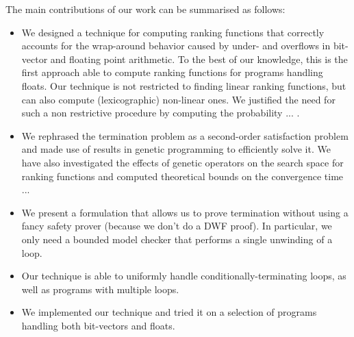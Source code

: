 \documentclass[preprint]{sigplanconf}
\theoremstyle{definition}
\begin{document}


 The main contributions of our work can be summarised as follows:
\begin{itemize}
\item We designed a technique for computing ranking functions that correctly accounts for the wrap-around behavior caused by under- and overflows in bit-vector and floating point arithmetic. To the best of our knowledge, this is the first approach able to compute ranking functions for programs handling floats. Our technique is not restricted to finding linear ranking functions, but can also compute (lexicographic) non-linear  ones. We justified the need for such a non restrictive procedure by computing the probability ... .
\item  We rephrased the termination problem as a second-order satisfaction problem and made 
use of results in genetic programming to efficiently solve it. We have also investigated the effects of genetic operators on the search space for ranking functions and computed theoretical 
bounds on the convergence time ...
\item We present a formulation that allows us to prove termination without using a fancy safety prover (because
we don't do a DWF proof).  In particular,
we only need a bounded model checker that performs a single unwinding of a loop.
\item Our technique is able to uniformly handle conditionally-terminating loops, as well as programs with
multiple loops.
\item We implemented our technique and tried it on a selection of programs handling both bit-vectors and floats.
\end{itemize}

\end{document}
